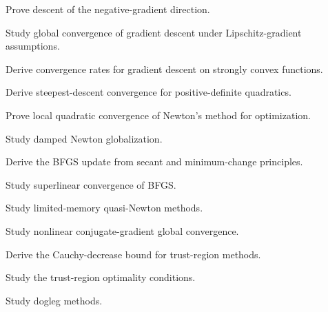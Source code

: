 \begin{exercise}[4]
Prove descent of the negative-gradient direction.
\end{exercise}

\begin{exercise}[4]
Study global convergence of gradient descent under Lipschitz-gradient
assumptions.
\end{exercise}

\begin{exercise}[4]
Derive convergence rates for gradient descent on strongly convex
functions.
\end{exercise}

\begin{exercise}[4]
Derive steepest-descent convergence for positive-definite quadratics.
\end{exercise}

\begin{exercise}[4]
Prove local quadratic convergence of Newton's method for optimization.
\end{exercise}

\begin{exercise}[4]
Study damped Newton globalization.
\end{exercise}

\begin{exercise}[4]
Derive the BFGS update from secant and minimum-change principles.
\end{exercise}

\begin{exercise}[4]
Study superlinear convergence of BFGS.
\end{exercise}

\begin{exercise}[4]
Study limited-memory quasi-Newton methods.
\end{exercise}

\begin{exercise}[4]
Study nonlinear conjugate-gradient global convergence.
\end{exercise}

\begin{exercise}[4]
Derive the Cauchy-decrease bound for trust-region methods.
\end{exercise}

\begin{exercise}[4]
Study the trust-region optimality conditions.
\end{exercise}

\begin{exercise}[4]
Study dogleg methods.
\end{exercise}

